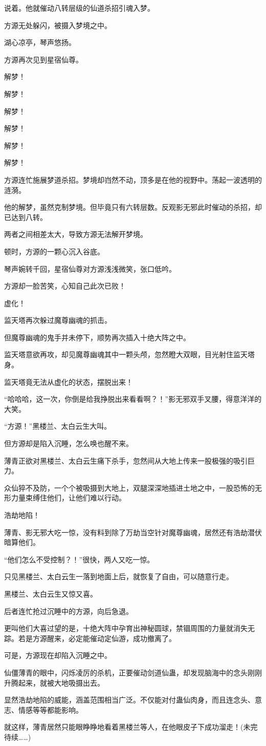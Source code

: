 \begin{this_body}
说着。他就催动八转层级的仙道杀招引魂入梦。

方源无处躲闪，被摄入梦境之中。

湖心凉亭，琴声悠扬。

方源再次见到星宿仙尊。

解梦！

解梦！

解梦！

解梦！

解梦！

解梦！

方源连忙施展梦道杀招。梦境却岿然不动，顶多是在他的视野中。荡起一波透明的涟漪。

他的解梦，虽然克制梦境。但毕竟只有六转层数。反观影无邪此时催动的杀招，却已达到八转。

两者之间相差太大，导致方源无法解开梦境。

顿时，方源的一颗心沉入谷底。

琴声婉转千回，星宿仙尊对方源浅浅微笑，张口低吟。

方源却一脸苦笑，心知自己此次已败！

虚化！

监天塔再次躲过魔尊幽魂的抓击。

但魔尊幽魂的鬼手并未停下，顺势再次插入十绝大阵之中。

监天塔意欲再攻，却见魔尊幽魂其中一颗头颅，忽然瞪大双眼，目光射住监天塔身。

监天塔竟无法从虚化的状态，摆脱出来！

“哈哈哈，这一次，你倒是给我挣脱出来看看啊？！”影无邪双手叉腰，得意洋洋的大笑。

“方源！”黑楼兰、太白云生大叫。

但方源却是陷入沉睡，怎么唤也醒不来。

薄青正欲对黑楼兰、太白云生痛下杀手，忽然间从大地上传来一股极强的吸引巨力。

众仙猝不及防，一个个被吸摄到大地上，双腿深深地插进土地之中，一股恐怖的无形力量束缚住他们，让他们难以行动。

浩劫地陷！

薄青、影无邪大吃一惊，没有料到除了万劫当空针对魔尊幽魂，居然还有浩劫潜伏暗算他们。

“他们怎么不受控制？！”很快，两人又吃一惊。

只见黑楼兰、太白云生一落到地面上后，就恢复了自由，可以随意行走。

黑楼兰、太白云生又惊又喜。

后者连忙抢过沉睡中的方源，向后急退。

更叫他们大喜过望的是，十绝大阵中孕育出神秘圆球，禁锢周围的力量就消失无踪。若是方源醒来，必定能催动定仙游，成功撤离了。

可是，方源现在却陷入沉睡之中。

仙僵薄青的眼中，闪烁凌厉的杀机，正要催动剑道仙蛊，却发现脑海中的念头刚刚升腾起来，就被大地吸摄出去。

显然浩劫地陷的威能，涵盖范围相当广泛。不仅能对付蛊仙肉身，而且连念头、意志、情感等等都能影响。

就这样，薄青居然只能眼睁睁地看着黑楼兰等人，在他眼皮子下成功溜走！(未完待续……)

\end{this_body}

